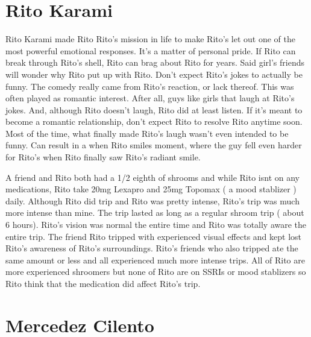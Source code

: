 \documentclass[12pt]{book}
\begin{document}
\chapter{Rito Karami}

Rito Karami made Rito Rito's mission in life to make Rito's let out one of the most powerful emotional responses. It's a matter of personal pride. If Rito can break through Rito's shell, Rito can brag about Rito for years. Said girl's friends will wonder why Rito put up with Rito. Don't expect Rito's jokes to actually be funny. The comedy really came from Rito's reaction, or lack thereof. This was often played as romantic interest. After all, guys like girls that laugh at Rito's jokes. And, although Rito doesn't laugh, Rito did at least listen. If it's meant to become a romantic relationship, don't expect Rito to resolve Rito anytime soon. Most of the time, what finally made Rito's laugh wasn't even intended to be funny. Can result in a when Rito smiles moment, where the guy fell even harder for Rito's when Rito finally saw Rito's radiant smile.



A friend and Rito both had a 1/2 eighth of shrooms and while Rito isnt on any medications, Rito take 20mg Lexapro and 25mg Topomax ( a mood stablizer ) daily. Although Rito did trip and Rito was pretty intense, Rito's trip was much more intense than mine. The trip lasted as long as a regular shroom trip ( about 6 hours). Rito's vision was normal the entire time and Rito was totally aware the entire trip. The friend Rito tripped with experienced visual effects and kept lost Rito's awareness of Rito's surroundings. Rito's friends who also tripped ate the same amount or less and all experienced much more intense trips. All of Rito are more experienced shroomers but none of Rito are on SSRIs or mood stablizers so Rito think that the medication did affect Rito's trip.



\chapter{Mercedez Cilento}
\end{document}

